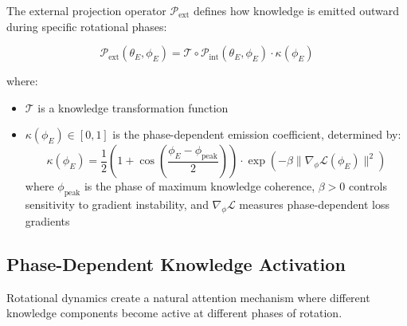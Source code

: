 \begin{definition}
The external projection operator $\mathcal{P}_{\text{ext}}$ defines how knowledge is emitted outward during specific rotational phases:

\begin{equation}
\mathcal{P}_{\text{ext}}(\theta_E, \phi_E) = \mathcal{T} \circ \mathcal{P}_{\text{int}}(\theta_E, \phi_E) \cdot \kappa(\phi_E)
\end{equation}

where:
\begin{itemize}
    \item $\mathcal{T}$ is a knowledge transformation function
    \item $\kappa(\phi_E) \in [0,1]$ is the phase-dependent emission coefficient, determined by:
    \begin{equation}
    \kappa(\phi_E) = \frac{1}{2}\left(1 + \cos\left(\frac{\phi_E - \phi_{\text{peak}}}{2}\right)\right) \cdot \exp\left(-\beta \|\nabla_{\phi} \mathcal{L}(\phi_E)\|^2\right)
    \end{equation}
    where $\phi_{\text{peak}}$ is the phase of maximum knowledge coherence, $\beta > 0$ controls sensitivity to gradient instability, and $\nabla_{\phi} \mathcal{L}$ measures phase-dependent loss gradients
\end{itemize}
\end{definition}

\subsection{Phase-Dependent Knowledge Activation}

Rotational dynamics create a natural attention mechanism where different knowledge components become active at different phases of rotation.

